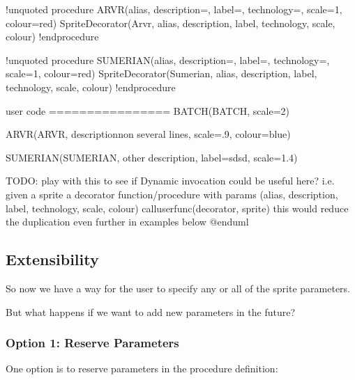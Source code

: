 \documentclass[letterpaper,10pt,english]{sphinxmanual}
\begin{document}
\begin{sphinxVerbatim}[commandchars=\\\{\},numbers=left,firstnumber=1,stepnumber=1]
!unquoted procedure \PYGZdl{}ARVR(\PYGZdl{}alias, \PYGZdl{}description=\PYGZdq{}\PYGZdq{}, \PYGZdl{}label=\PYGZdq{}\PYGZdq{}, \PYGZdl{}technology=\PYGZdq{}\PYGZdq{}, \PYGZdl{}scale=1, \PYGZdl{}colour=\PYGZdq{}red\PYGZdq{})
\PYGZdl{}SpriteDecorator(\PYGZdl{}Arvr, \PYGZdl{}alias, \PYGZdl{}description, \PYGZdl{}label, \PYGZdl{}technology, \PYGZdl{}scale, \PYGZdl{}colour)
!endprocedure

!unquoted procedure \PYGZdl{}SUMERIAN(\PYGZdl{}alias, \PYGZdl{}description=\PYGZdq{}\PYGZdq{}, \PYGZdl{}label=\PYGZdq{}\PYGZdq{}, \PYGZdl{}technology=\PYGZdq{}\PYGZdq{}, \PYGZdl{}scale=1, \PYGZdl{}colour=\PYGZdq{}red\PYGZdq{})
\PYGZdl{}SpriteDecorator(\PYGZdl{}Sumerian, \PYGZdl{}alias, \PYGZdl{}description, \PYGZdl{}label, \PYGZdl{}technology, \PYGZdl{}scale, \PYGZdl{}colour)
!endprocedure




\PYGZsq{}user code
\PYGZsq{}================
\PYGZdl{}BATCH(BATCH, \PYGZdl{}scale=2)

\PYGZdl{}ARVR(ARVR, \PYGZdq{}description\PYGZbs{}non several lines\PYGZdq{}, \PYGZdl{}scale=.9, \PYGZdl{}colour=\PYGZdq{}blue\PYGZdq{})

\PYGZdl{}SUMERIAN(SUMERIAN, \PYGZdq{}other description\PYGZdq{}, \PYGZdl{}label=\PYGZdq{}sdsd\PYGZdq{}, \PYGZdl{}scale=1.4)


\PYGZsq{}TODO: play with this to see if \PYGZdq{}Dynamic invocation\PYGZdq{} could be useful here? 
\PYGZsq{} i.e. given 
\PYGZsq{}   a sprite
\PYGZsq{}   a decorator function/procedure with params (\PYGZdl{}alias, \PYGZdl{}description, \PYGZdl{}label, \PYGZdl{}technology, \PYGZdl{}scale, \PYGZdl{}colour)
\PYGZsq{} \PYGZpc{}call\PYGZus{}user\PYGZus{}func(\PYGZdq{}decorator\PYGZdq{}, \PYGZdq{}\PYGZdl{}sprite\PYGZdq{})
\PYGZsq{} this would reduce the duplication even further in examples below 
@enduml
\end{sphinxVerbatim}


\subsection{Extensibility}
\label{\detokenize{Stdlib/StandardisingStdLib:extensibility}}
So now we have a way for the user to specify any or all of the sprite parameters.

But what happens if we want to add new parameters in the future?


\subsubsection{Option 1: Reserve Parameters}
\label{\detokenize{Stdlib/StandardisingStdLib:option-1-reserve-parameters}}
One option is to reserve parameters in the procedure definition:
\end{document}
